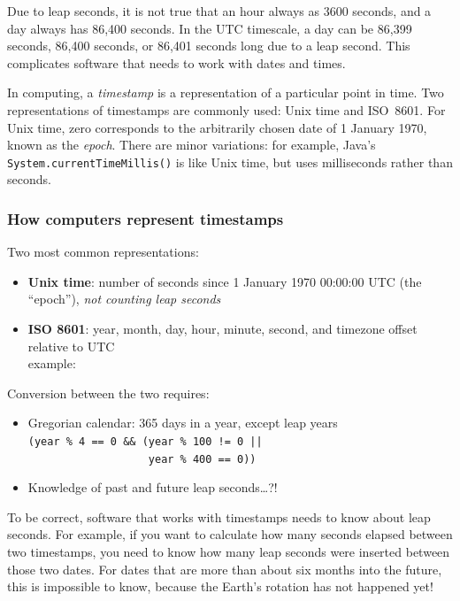 Due to leap seconds, it is not true that an hour always as 3600 seconds, and a day always has 86,400 seconds.
In the UTC timescale, a day can be 86,399 seconds, 86,400 seconds, or 86,401 seconds long due to a leap second.
This complicates software that needs to work with dates and times.

In computing, a \emph{timestamp} is a representation of a particular point in time.
Two representations of timestamps are commonly used: Unix time and ISO~8601.
For Unix time, zero corresponds to the arbitrarily chosen date of 1 January 1970, known as the \emph{epoch}.
There are minor variations: for example, Java's \verb|System.currentTimeMillis()| is like Unix time, but uses milliseconds rather than seconds.

\begin{frame}
    \label{s:time-representation}
    \frametitle{How computers represent timestamps}
    Two most common representations:
    \begin{itemize}
        \item \textbf{Unix time}: number of seconds since 1 January 1970 00:00:00 UTC (the ``epoch''), \emph{not counting leap seconds}
        \item \textbf{ISO 8601}: year, month, day, hour, minute, second, and timezone offset relative to UTC\\
            example: \texttt{\timestampexample}\\[1em]
    \end{itemize}\pause
    Conversion between the two requires:
    \begin{itemize}
        \item Gregorian calendar: 365 days in a year, except leap years\\
            \texttt{(year \% 4 == 0 \&\& (year \% 100 != 0 ||}\\
            \texttt{~~~~~~~~~~~~~~~~~~~year \% 400 == 0))}
        \item Knowledge of past and future leap seconds\dots?!
    \end{itemize}
\end{frame}
\label{l:time-representation}

To be correct, software that works with timestamps needs to know about leap seconds.
For example, if you want to calculate how many seconds elapsed between two timestamps, you need to know how many leap seconds were inserted between those two dates.
For dates that are more than about six months into the future, this is impossible to know, because the Earth's rotation has not happened yet!

